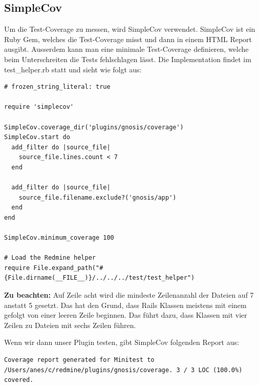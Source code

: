 \begin{minipage}{\textwidth}
  \subsection{SimpleCov}
  Um die Test-Coverage zu messen, wird SimpleCov verwendet. SimpleCov ist ein Ruby Gem, welches die Test-Coverage misst und
  dann in einem HTML Report ausgibt. Ausserdem kann man eine minimale Test-Coverage definieren, welche beim Unterschreiten
  die Tests fehlschlagen lässt. \newline
  Die Implementation findet im test\_helper.rb statt und sieht wie folgt aus:
  \begin{codebox}[]
    \begin{verbatim}
# frozen_string_literal: true

require 'simplecov'

SimpleCov.coverage_dir('plugins/gnosis/coverage')
SimpleCov.start do
  add_filter do |source_file|
    source_file.lines.count < 7
  end

  add_filter do |source_file|
    source_file.filename.exclude?('gnosis/app')
  end
end

SimpleCov.minimum_coverage 100

# Load the Redmine helper
require File.expand_path("#{File.dirname(__FILE__)}/../../../test/test_helper")
    \end{verbatim}
  \end{codebox}
  \textbf{Zu beachten:} Auf Zeile acht wird die mindeste Zeilenanzahl der Dateien auf 7 anstatt 5 gesetzt. Das hat den
  Grund, dass Rails Klassen meistens mit einem  gefolgt von einer
  leeren Zeile beginnen. Das führt dazu, dass Klassen mit vier Zeilen zu Dateien mit sechs Zeilen führen. \newline

  Wenn wir dann unser Plugin testen, gibt SimpleCov folgenden Report aus:
  \begin{codebox}
    \begin{verbatim}
Coverage report generated for Minitest to /Users/anes/c/redmine/plugins/gnosis/coverage. 3 / 3 LOC (100.0%) covered.
    \end{verbatim}
  \end{codebox}
\end{minipage}

